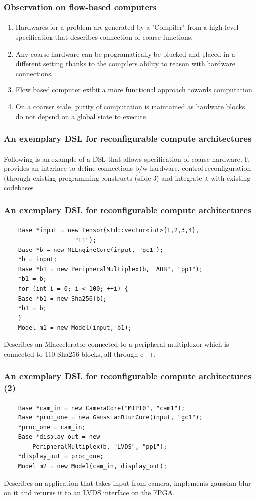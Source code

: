 \documentclass{beamer}
\begin{document}
\begin{frame}[fragile]
  \frametitle{Observation on flow-based computers}
  \framesubtitle{}
  \begin{enumerate}
      
    \item Hardwares for a problem are generated by a "Compiler" from a high-level
      specification that describes connection of coarse functions.
    \item Any coarse hardware can be programatically be plucked and placed in a
      different setting thanks to the compilers ability to reason with hardware
      connections.
    \item Flow based computer exibit a more functional approach towards
      computation
    \item On a coarser scale, purity of computation is maintained as hardware
      blocks do not depend on a global state to execute
  \end{enumerate}
\end{frame}

\begin{frame}[fragile]
  \frametitle{An exemplary DSL for reconfigurable compute architectures}
\framesubtitle{}
  Following is an example of a DSL that allows specification of coarse hardware.
  It provides an interface to define connections b/w hardware, control
  reconfiguration (through existing programming constructs (slide 3) and
  integrate it with existing codebases

\end{frame}

\begin{frame}[fragile]
  \frametitle{An exemplary DSL for reconfigurable compute architectures}
\framesubtitle{}
  \begin{verbatim}
    Base *input = new Tensor(std::vector<int>{1,2,3,4}, 
                    "t1");
    Base *b = new MLEngineCore(input, "gc1");
    *b = input;
    Base *b1 = new PeripheralMultiplex(b, "AHB", "pp1");
    *b1 = b;
    for (int i = 0; i < 100; ++i) {
    Base *b1 = new Sha256(b);
    *b1 = b;
    }
    Model m1 = new Model(input, b1);
  \end{verbatim}

  Describes an Mlaccelerator connected to a peripheral multiplexor
  which is connected to 100 Sha256 blocks, all through c++.
\end{frame}

\begin{frame}[fragile]
  \frametitle{An exemplary DSL for reconfigurable compute architectures (2)}
\framesubtitle{}
  \begin{verbatim}
    Base *cam_in = new CameraCore("MIPI0", "cam1");
    Base *proc_one = new GaussianBlurCore(input, "gc1");
    *proc_one = cam_in;
    Base *display_out = new 
        PeripheralMultiplex(b, "LVDS", "pp1");
    *display_out = proc_one;
    Model m2 = new Model(cam_in, display_out);
  \end{verbatim}
  Describes an application that takes input from camera,
  implements gaussian blur on it and returns it to an LVDS interface on the
  FPGA.

\end{frame}
\end{document}

